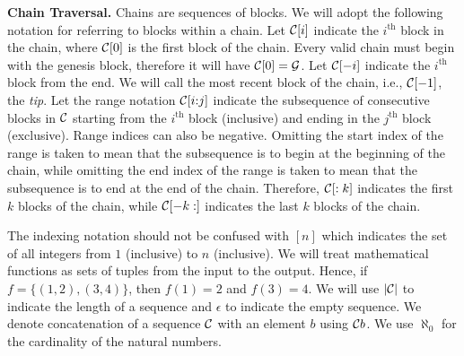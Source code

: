 \noindent
\textbf{Chain Traversal.}
Chains are sequences of blocks. We will adopt the following notation for
referring to blocks within a chain. Let $\mathcal{C}[i]$ indicate the $i^\text{th}$
block in the chain, where $\mathcal{C}[0]$ is the first block of the chain. Every
valid chain must begin with the genesis block, therefore it will have $\mathcal{C}[0]
= \mathcal{G}$. Let $\mathcal{C}[-i]$ indicate the $i^\text{th}$ block from the end.
We will call the most recent block of the chain, i.e., $\mathcal{C}[-1]$, the
\emph{tip}. Let the range notation $\mathcal{C}[i{:}j]$ indicate the subsequence of
consecutive blocks in $\mathcal{C}$ starting from the $i^\text{th}$ block (inclusive)
and ending in the $j^\text{th}$ block (exclusive). Range indices can also be
negative. Omitting the start index of the range is taken to mean that the
subsequence is to begin at the beginning of the chain, while omitting the end
index of the range is taken to mean that the subsequence is to end at the end of
the chain. Therefore, $\mathcal{C}[:k]$ indicates the first $k$ blocks of the chain,
while $\mathcal{C}[-k:]$ indicates the last $k$ blocks of the chain.

The indexing notation should not be confused with $[n]$ which indicates the set
of all integers from $1$ (inclusive) to $n$ (inclusive). We will treat
mathematical functions as sets of tuples from the input to the output. Hence, if
$f = \{(1, 2), (3, 4)\}$, then $f(1) = 2$ and $f(3) = 4$. We will use $|\mathcal{C}|$
to indicate the length of a sequence and $\epsilon$ to indicate the empty
sequence. We denote concatenation of a sequence $\mathcal{C}$ with an element $b$
using $\mathcal{C} b$. We use $\aleph_0$ for the cardinality of the natural numbers.
